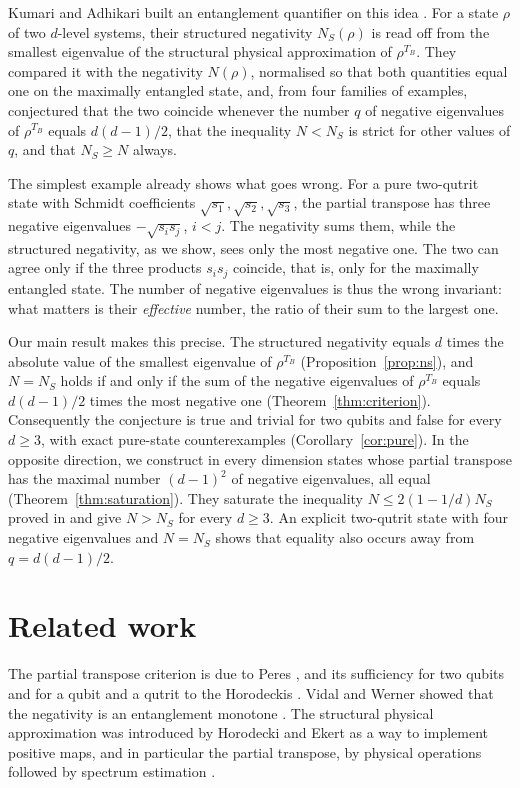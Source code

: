 \documentclass[11pt,a4paper]{article}
\theoremstyle{definition}
\theoremstyle{plain}
\newcommand{\NS}{N_{S}}
\begin{document}
Kumari and Adhikari built an entanglement quantifier on this idea
\cite{KumariAdhikari2022}. For a state $\rho$ of two $d$-level systems, their
structured negativity $\NS(\rho)$ is read off from the smallest eigenvalue of
the structural physical approximation of $\rho^{T_B}$. They compared it with
the negativity $N(\rho)$, normalised so that both quantities equal one on the
maximally entangled state, and, from four families of examples, conjectured
that the two coincide whenever the number $q$ of negative eigenvalues of
$\rho^{T_B}$ equals $d(d-1)/2$, that the inequality $N<\NS$ is strict for
other values of $q$, and that $\NS\ge N$ always.

The simplest example already shows what goes wrong. For a pure two-qutrit
state with Schmidt coefficients $\sqrt{s_1},\sqrt{s_2},\sqrt{s_3}$, the
partial transpose has three negative eigenvalues $-\sqrt{s_is_j}$, $i<j$. The
negativity sums them, while the structured negativity, as we show, sees only
the most negative one. The two can agree only if the three products
$s_is_j$ coincide, that is, only for the maximally entangled state. The
number of negative eigenvalues is thus the wrong invariant: what matters is
their \emph{effective} number, the ratio of their sum to the largest one.

Our main result makes this precise. The structured negativity equals $d$
times the absolute value of the smallest eigenvalue of $\rho^{T_B}$
(Proposition~\ref{prop:ns}), and $N=\NS$ holds if and only if the sum of the
negative eigenvalues of $\rho^{T_B}$ equals $d(d-1)/2$ times the most negative
one (Theorem~\ref{thm:criterion}). Consequently the conjecture is true and
trivial for two qubits and false for every $d\ge3$, with exact pure-state
counterexamples (Corollary~\ref{cor:pure}). In the opposite direction, we
construct in every dimension states whose partial transpose has the maximal
number $(d-1)^2$ of negative eigenvalues, all equal
(Theorem~\ref{thm:saturation}). They saturate the inequality
$N\le2(1-1/d)\NS$ proved in \cite{KumariAdhikari2022} and give $N>\NS$ for
every $d\ge3$. An explicit two-qutrit state with four negative eigenvalues and
$N=\NS$ shows that equality also occurs away from $q=d(d-1)/2$.

\section{Related work}\label{sec:related}
The partial transpose criterion is due to Peres \cite{Peres1996}, and its
sufficiency for two qubits and for a qubit and a qutrit to the Horodeckis
\cite{Horodecki1996}. Vidal and Werner showed that the negativity is an
entanglement monotone \cite{VidalWerner2002}. The structural physical
approximation was introduced by Horodecki and Ekert as a way to implement
positive maps, and in particular the partial transpose, by physical
operations followed by spectrum estimation \cite{HorodeckiEkert2002}.
\end{document}
